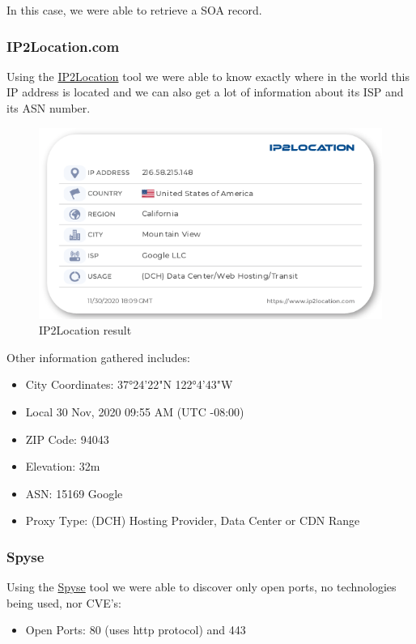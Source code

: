 In this case, we were able to retrieve a SOA record.

\subsubsection{IP2Location.com}

Using the \href{https://www.ip2location.com/demo}{IP2Location} tool we were able to know exactly where in the world this IP address is located and we can also get a lot of information about its ISP and its ASN number.

\begin{figure}[ht!]
 	\centering
 	\includegraphics[width=0.6\linewidth]{img/ip2location216.png}
 	\caption{IP2Location result}
 \end{figure}
 
 \pagebreak
 
 Other information gathered includes:
 \begin{itemize}
    \item City Coordinates: 37°24'22"N   122°4'43"W
    \item Local 30 Nov, 2020 09:55 AM (UTC -08:00)
    \item ZIP Code: 94043
    \item Elevation: 32m
    \item ASN: 15169 Google
    \item Proxy Type: (DCH) Hosting Provider, Data Center or CDN Range
 \end{itemize}
 
\subsubsection{Spyse}

Using the \href{https://spyse.com/target/ip/216.58.215.148}{Spyse} tool we were able to discover only open ports, no technologies being used, nor CVE's: 
 
 \begin{itemize}
    \item Open Ports: 80 (uses http protocol) and 443
 \end{itemize}
 
